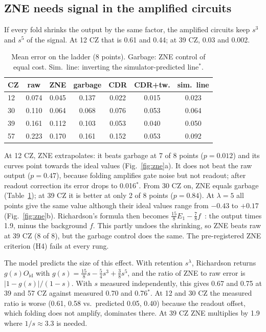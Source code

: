 \documentclass[aps,pra,twocolumn,superscriptaddress,nofootinbib,10pt]{revtex4-2}
\newcommand{\Oid}{O_{\mathrm{id}}}
\newcommand{\ex}{$^{*}$}
\begin{document}
\subsection{ZNE needs signal in the amplified circuits}

If every fold shrinks the output by the same factor, the amplified circuits keep $s^3$ and
$s^5$ of the signal. At 12 CZ that is 0.61 and 0.44; at 39 CZ, 0.03 and 0.002.

\begin{table}[b]
\caption{Mean error on the ladder (8 points). Garbage: ZNE control of equal cost.
Sim.\ line: inverting the simulator-predicted line\ex.}
\label{tab:ladder}
\begin{ruledtabular}
\begin{tabular}{lcccccc}
CZ & raw & ZNE & garbage & CDR & CDR+tw. & sim.\ line \\
\hline
12 & 0.074 & 0.045 & 0.137 & 0.022 & 0.015 & 0.023 \\
30 & 0.110 & 0.064 & 0.068 & 0.076 & 0.053 & 0.064 \\
39 & 0.161 & 0.112 & 0.103 & 0.053 & 0.040 & 0.050 \\
57 & 0.223 & 0.170 & 0.161 & 0.152 & 0.053 & 0.092 \\
\end{tabular}
\end{ruledtabular}
\end{table}

At 12 CZ, ZNE extrapolates: it beats garbage at 7 of 8 points ($p=0.012$) and its curves point
towards the ideal values (Fig.~\ref{fig:zne}a). It does not beat the raw output ($p=0.47$),
because folding amplifies gate noise but not readout; after readout correction its error drops
to 0.016\ex. From 30 CZ on, ZNE equals garbage (Table~\ref{tab:ladder}); at 39 CZ it is better
at only 2 of 8 points ($p=0.84$). At $\lambda=5$ all points give the same value although their
ideal values range from $-0.43$ to $+0.17$ (Fig.~\ref{fig:zne}b). Richardson's formula then
becomes $\tfrac{15}{8}E_1-\tfrac{7}{8}f$~\cite{koster2026}: the output times 1.9, minus the
background $f$. This partly undoes the shrinking, so ZNE beats raw at 39 CZ (8 of 8), but the
garbage control does the same. The pre-registered ZNE criterion (H4) fails at every rung.

The model predicts the size of this effect. With retention $s^\lambda$, Richardson returns
$g(s)\Oid$ with $g(s)=\tfrac{15}{8}s-\tfrac54 s^3+\tfrac38 s^5$, and the ratio of ZNE to raw
error is $|1-g(s)|/(1-s)$. With $s$ measured independently, this gives 0.67 and 0.75 at 39 and
57 CZ against measured 0.70 and 0.76\ex. At 12 and 30 CZ the measured ratio is worse (0.61,
0.58 vs.\ predicted 0.05, 0.40) because the readout offset, which folding does not amplify,
dominates there. At 39 CZ ZNE multiplies by 1.9 where $1/s\approx3.3$ is needed.
\end{document}
